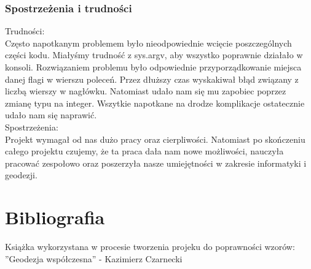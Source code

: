 \documentclass[11pt,a4paper]{article}
\begin{document}
\subsubsection{Spostrzeżenia i trudności}
Trudności:\\
Często napotkanym problemem było nieodpowiednie wcięcie poszczególnych części kodu. Miałyśmy trudność z sys.argv, aby wszystko poprawnie działało w konsoli. Rozwiązaniem problemu było odpowiednie przyporządkowanie miejsca danej flagi w wierszu poleceń. Przez dłuższy czas wyskakiwał błąd związany z liczbą wierszy w nagłówku. Natomiast udało nam się mu zapobiec poprzez zmianę typu na integer. Wszytkie napotkane na drodze komplikacje ostatecznie udało nam się naprawić. \\
Spostrzeżenia:\\
Projekt wymagał od nas dużo pracy oraz cierpliwości. Natomiast po skończeniu całego projektu czujemy, że ta praca dała nam nowe możliwości, nauczyła pracować zespołowo oraz poszerzyła nasze umiejętności w zakresie informatyki i geodezji. 

\section {Bibliografia}
Książka wykorzystana w procesie tworzenia projeku do poprawności wzorów:\\
''Geodezja współczesna'' - Kazimierz Czarnecki
\end{document}
